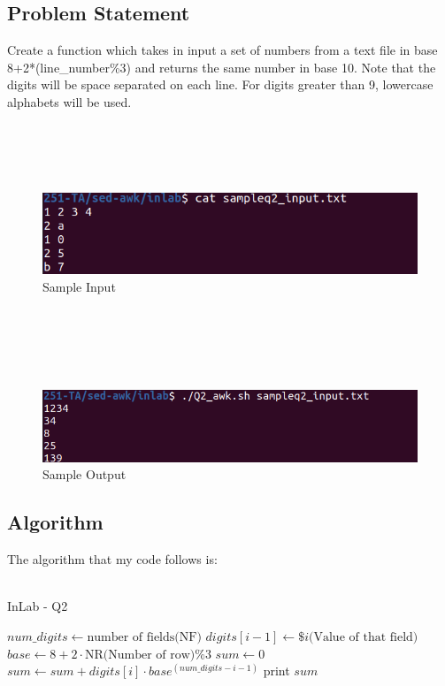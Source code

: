 \documentclass[12pt]{article}
\begin{document}
\subsection{Problem Statement}
Create a function which takes in input a set of numbers from a text file 
in base 8+2*(line\_number\%3) 
and returns the same number in base 10. 
Note that the digits will be space separated on each line. 
For digits greater than 9, lowercase alphabets will be used.\\\\\\\\\\
\begin{figure}[h]
    \includegraphics[width=\textwidth]{inlab3_sample_input.png}
    \caption[]{Sample Input}
\end{figure}\\\\\\\\
\begin{figure}[h]
    \includegraphics[width=\textwidth]{inlab3_sample_output.png}
    \caption[]{Sample Output}
\end{figure}
\newpage

\subsection{Algorithm}
\vspace*{2em}
The algorithm that my code follows is:\\\\
\begin{algorithm*}
    \label{Q2}
    \caption{InLab - Q2}\label{alg:Q2}
    {
        $num\_digits \gets \textrm{number of fields(NF)}$\;
        {
            $digits[i-1] \gets \$i\textrm{(Value of that field)}$\;
        }
        $base \gets 8 + 2\cdot\textrm{NR(Number of row)\%}3$\;
        $sum \gets 0$\;
        {
            $sum \gets sum + digits[i]\cdot base^{(num\_digits-i-1)}$\;
        }
        print $sum$\;
    } 
\end{algorithm*}
\newpage
\end{document}
